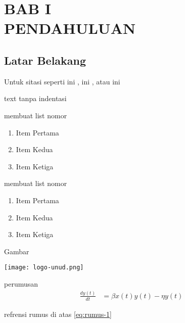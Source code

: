 \chapter*{BAB I\\PENDAHULUAN}

\section{Latar Belakang}
Untuk sitasi seperti ini \cite{Luschi2013}, ini \citep{Luschi2013}, atau ini \citet{Luschi2013}

\noindent text tanpa indentasi \blindtext[1]

membuat list nomor
\begin{enumerate}[noitemsep]
    \item Item Pertama
    \item Item Kedua
    \item Item Ketiga
\end{enumerate}

membuat list nomor
\begin{enumerate}[label=\alph*]
    \item Item Pertama
    \item Item Kedua
    \item Item Ketiga
\end{enumerate}

Gambar
\begin{center}
    \texttt{[image: logo-unud.png]}
    \label{fig:2-kompartemen}
\end{center}

perumusan
\begin{equation}\label{eq:rumus-1}
    \begin{aligned}
        \frac{dy(t)}{dt} & = \beta x(t)y(t) - \eta y(t)
    \end{aligned}
\end{equation}

refrensi rumus di atas \eqref{eq:rumus-1}

